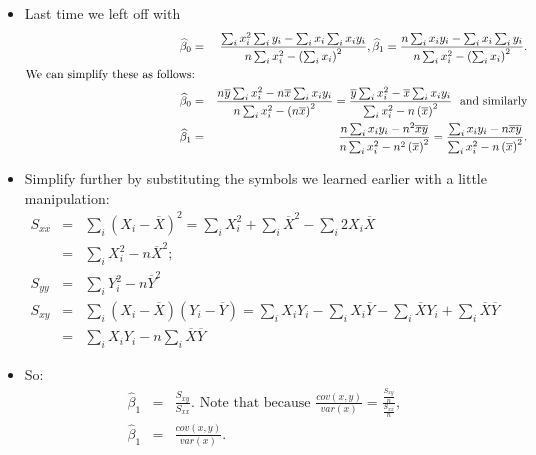 \documentclass[11pt]{article}
\begin{document}
\begin{itemize}
\item Last time we left off with 
\begin{eqnarray*}
\widehat{\beta }_{0} &=&\frac{\sum\nolimits_{i}x_{i}^{2}\sum%
\nolimits_{i}y_{i}-\sum\nolimits_{i}x_{i}\sum\nolimits_{i}x_{i}y_{i}}{%
n\sum\nolimits_{i}x_{i}^{2}-\left( \sum\nolimits_{i}x_{i}\right) ^{2}},%
\widehat{\beta }_{1}=\frac{n\sum\nolimits_{i}x_{i}y_{i}-\sum%
\nolimits_{i}x_{i}\sum\nolimits_{i}y_{i}}{n\sum\nolimits_{i}x_{i}^{2}-\left(
\sum\nolimits_{i}x_{i}\right) ^{2}}. \\
\text{We can simplify these as follows} &\text{:}& \\
\widehat{\beta }_{0} &=&\frac{n\overline{y}\sum\nolimits_{i}x_{i}^{2}-n%
\overline{x}\sum\nolimits_{i}x_{i}y_{i}}{n\sum\nolimits_{i}x_{i}^{2}-\left( n%
\overline{x}\right) ^{2}}=\frac{\overline{y}\sum\nolimits_{i}x_{i}^{2}-%
\overline{x}\sum\nolimits_{i}x_{i}y_{i}}{\sum\nolimits_{i}x_{i}^{2}-n\left( 
\overline{x}\right) ^{2}}\text{ \ and similarly} \\
\widehat{\beta }_{1} &=&\frac{n\sum\nolimits_{i}x_{i}y_{i}-n^{2}\overline{x}%
\overline{y}}{n\sum\nolimits_{i}x_{i}^{2}-n^{2}\left( \overline{x}\right)
^{2}}=\frac{\sum\nolimits_{i}x_{i}y_{i}-n\overline{x}\overline{y}}{%
\sum\nolimits_{i}x_{i}^{2}-n\left( \overline{x}\right) ^{2}}.
\end{eqnarray*}

\item Simplify further by substituting the symbols we learned earlier with a
little manipulation:%
\begin{eqnarray*}
S_{xx} &=&\sum\nolimits_{i}\left( X_{i}-\overline{X}\right)
^{2}=\sum\nolimits_{i}X_{i}^{2}+\sum\nolimits_{i}\overline{X}%
^{2}-\sum\nolimits_{i}2X_{i}\overline{X} \\
&=&\sum\nolimits_{i}X_{i}^{2}-n\overline{X}^{2}; \\
S_{yy} &=&\sum\nolimits_{i}Y_{i}^{2}-n\overline{Y}^{2} \\
S_{xy} &=&\sum\nolimits_{i}\left( X_{i}-\overline{X}\right) \left( Y_{i}-%
\overline{Y}\right) =\sum\nolimits_{i}X_{i}Y_{i}-\sum\nolimits_{i}X_{i}%
\overline{Y}-\sum\nolimits_{i}\overline{X}Y_{i}+\sum\nolimits_{i}\overline{X}%
\overline{Y} \\
&=&\sum\nolimits_{i}X_{i}Y_{i}-n\sum\nolimits_{i}\overline{X}\overline{Y}
\end{eqnarray*}

\item So:%
\begin{eqnarray*}
\widehat{\beta }_{1} &=&\frac{S_{xy}}{S_{xx}}.\text{ \ Note that because }%
\frac{cov(x,y)}{var(x)}=\frac{\frac{S_{xy}}{n}}{\frac{S_{xx}}{n}}, \\
\widehat{\beta }_{1} &=&\frac{cov(x,y)}{var(x)}.
\end{eqnarray*}


\end{itemize}
\end{document}
